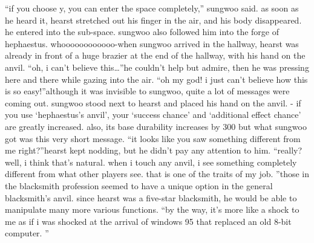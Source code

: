 “if you choose y, you can enter the space completely,” sungwoo said.
as soon as he heard it, hearst stretched out his finger in the air, and his body disappeared.
 he entered into the sub-space.
 sungwoo also followed him into the forge of hephaestus.
whoooooooooooo-when sungwoo arrived in the hallway, hearst was already in front of a huge brazier at the end of the hallway, with his hand on the anvil.
“oh, i can’t believe this…”he couldn’t help but admire, then he was pressing here and there while gazing into the air.
“oh my god! i just can’t believe how this is so easy!”although it was invisible to sungwoo, quite a lot of messages were coming out.
sungwoo stood next to hearst and placed his hand on the anvil.
- if you use ‘hephaestus’s anvil’, your ‘success chance’ and ‘additional effect chance’ are greatly increased.
 also, its base durability increases by 300%
but what sungwoo got was this very short message.
“it looks like you saw something different from me right?”hearst kept nodding, but he didn’t pay any attention to him.
“really? well, i think that’s natural.
 when i touch any anvil, i see something completely different from what other players see.
 that is one of the traits of my job.
”those in the blacksmith profession seemed to have a unique option in the general blacksmith’s anvil.
 since hearst was a five-star blacksmith, he would be able to manipulate many more various functions.
“by the way, it’s more like a shock to me as if i was shocked at the arrival of windows 95 that replaced an old 8-bit computer.
”


